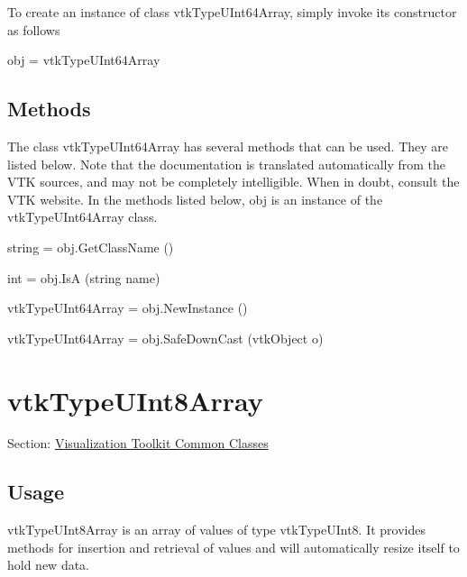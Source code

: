 To create an instance of class vtk\-Type\-U\-Int64\-Array, simply invoke its constructor as follows \begin{DoxyVerb}  obj = vtkTypeUInt64Array
\end{DoxyVerb}
 \hypertarget{vtkwidgets_vtkxyplotwidget_Methods}{}\subsection{Methods}\label{vtkwidgets_vtkxyplotwidget_Methods}
The class vtk\-Type\-U\-Int64\-Array has several methods that can be used. They are listed below. Note that the documentation is translated automatically from the V\-T\-K sources, and may not be completely intelligible. When in doubt, consult the V\-T\-K website. In the methods listed below, {\ttfamily obj} is an instance of the vtk\-Type\-U\-Int64\-Array class. 
\begin{DoxyItemize}
\item {\ttfamily string = obj.\-Get\-Class\-Name ()}  
\item {\ttfamily int = obj.\-Is\-A (string name)}  
\item {\ttfamily vtk\-Type\-U\-Int64\-Array = obj.\-New\-Instance ()}  
\item {\ttfamily vtk\-Type\-U\-Int64\-Array = obj.\-Safe\-Down\-Cast (vtk\-Object o)}  
\end{DoxyItemize}\hypertarget{vtkcommon_vtktypeuint8array}{}\section{vtk\-Type\-U\-Int8\-Array}\label{vtkcommon_vtktypeuint8array}
Section\-: \hyperlink{sec_vtkcommon}{Visualization Toolkit Common Classes} \hypertarget{vtkwidgets_vtkxyplotwidget_Usage}{}\subsection{Usage}\label{vtkwidgets_vtkxyplotwidget_Usage}
vtk\-Type\-U\-Int8\-Array is an array of values of type vtk\-Type\-U\-Int8. It provides methods for insertion and retrieval of values and will automatically resize itself to hold new data.


